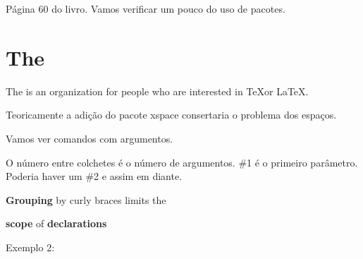\documentclass{article}
\begin{document}
Página 60 do livro.
Vamos verificar um pouco do uso de pacotes.

\usepackage{xspace}
\section{The \TUG}

The \TUG is an organization for people
who are interested in \TeX or \LaTeX.

Teoricamente a adição do pacote xspace consertaria o problema dos espaços.

Vamos ver comandos com argumentos.

\newcommand{\keyword}[1]{\textbf{#1}}

O número entre colchetes é o número de argumentos.
\#1 é o primeiro parâmetro. Poderia haver um \#2 e assim
em diante.


\keyword{Grouping} by curly braces limits the

\keyword{scope} of \keyword{declarations}

Exemplo 2:
\end{document}
